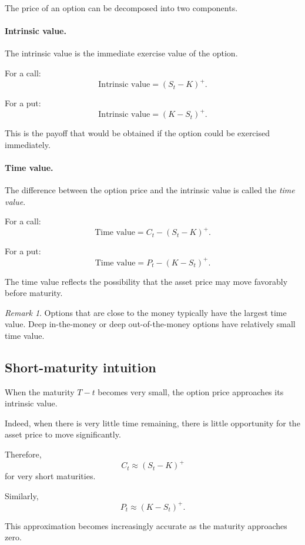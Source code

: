 \documentclass[11pt]{article}
\newcommand{\1}{\mathbf{1}}
\theoremstyle{plain}
\theoremstyle{definition}
\theoremstyle{remark}
\newtheorem{remark}[theorem]{Remark}
\begin{document}
The price of an option can be decomposed into two components.

\paragraph{Intrinsic value.}

The intrinsic value is the immediate exercise value of the option.

For a call:
\[
\text{Intrinsic value} = (S_t-K)^+.
\]

For a put:
\[
\text{Intrinsic value} = (K-S_t)^+.
\]

This is the payoff that would be obtained if the option could be exercised
immediately.

\paragraph{Time value.}

The difference between the option price and the intrinsic value is called
the \emph{time value}.

For a call:
\[
\text{Time value} = C_t - (S_t-K)^+ .
\]

For a put:
\[
\text{Time value} = P_t - (K-S_t)^+ .
\]

The time value reflects the possibility that the asset price may move
favorably before maturity.

\begin{remark}
Options that are close to the money typically have the largest time value.
Deep in-the-money or deep out-of-the-money options have relatively small
time value.
\end{remark}

\subsection{Short-maturity intuition}

When the maturity \(T-t\) becomes very small, the option price approaches
its intrinsic value.

Indeed, when there is very little time remaining, there is little
opportunity for the asset price to move significantly.

Therefore,
\[
C_t \approx (S_t-K)^+
\]
for very short maturities.

Similarly,
\[
P_t \approx (K-S_t)^+ .
\]

This approximation becomes increasingly accurate as the maturity
approaches zero.
\end{document}
